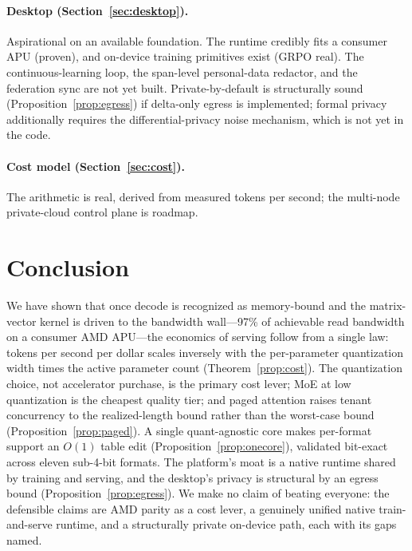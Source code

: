 \documentclass[11pt]{article}
\begin{document}
\paragraph{Desktop (Section~\ref{sec:desktop}).} Aspirational on an available foundation. The runtime credibly fits a consumer APU (proven), and on-device training primitives exist (GRPO real). The continuous-learning loop, the span-level personal-data redactor, and the federation sync are not yet built. Private-by-default is structurally sound (Proposition~\ref{prop:egress}) if delta-only egress is implemented; formal privacy additionally requires the differential-privacy noise mechanism, which is not yet in the code.

\paragraph{Cost model (Section~\ref{sec:cost}).} The arithmetic is real, derived from measured tokens per second; the multi-node private-cloud control plane is roadmap.

\section{Conclusion}

We have shown that once decode is recognized as memory-bound and the matrix-vector kernel is driven to the bandwidth wall---97\% of achievable read bandwidth on a consumer AMD APU---the economics of serving follow from a single law: tokens per second per dollar scales inversely with the per-parameter quantization width times the active parameter count (Theorem~\ref{prop:cost}). The quantization choice, not accelerator purchase, is the primary cost lever; MoE at low quantization is the cheapest quality tier; and paged attention raises tenant concurrency to the realized-length bound rather than the worst-case bound (Proposition~\ref{prop:paged}). A single quant-agnostic core makes per-format support an $O(1)$ table edit (Proposition~\ref{prop:onecore}), validated bit-exact across eleven sub-4-bit formats. The platform's moat is a native runtime shared by training and serving, and the desktop's privacy is structural by an egress bound (Proposition~\ref{prop:egress}). We make no claim of beating everyone: the defensible claims are AMD parity as a cost lever, a genuinely unified native train-and-serve runtime, and a structurally private on-device path, each with its gaps named.
\end{document}

